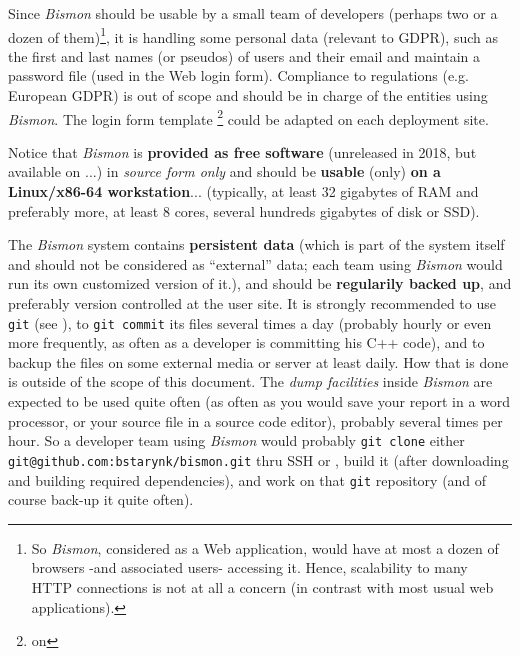 \begin{itemize}
      Since \textit{Bismon} should be usable by a small team of
      developers (perhaps two or a dozen of them)\footnote{So
        \textit{Bismon}, considered as a Web application, would have
        at most a dozen of browsers -and associated users- accessing
        it. Hence, scalability to many HTTP connections is not at all
        a concern (in contrast with most usual web applications).}, it
      is handling some personal data (relevant to GDPR), such as the
      first and last names (or pseudos) of users and their email and
      maintain a password file (used in the Web login
      form). Compliance to regulations (e.g. European GDPR) is out of
      scope and should be in charge of the entities using
      \textit{Bismon}. The login form template \footnote{on
      }
      could be adapted on each deployment site.
\end{itemize}

Notice that \textit{Bismon} is \textbf{provided as free software}
(unreleased in 2018, but available on
 ...) in \emph{source form only} and
should be \textbf{usable} (only) \textbf{on a Linux/x86-64
  workstation}... (typically, at least 32 gigabytes of RAM and
preferably more, at least 8 cores, several hundreds gigabytes of disk
or SSD).

The \textit{Bismon} system contains \textbf{persistent data} (which is
part of the system itself and should not be considered as ``external''
data; each team using \textit{Bismon} would run its own customized
version of it.), and should be \textbf{regularily backed up}, and
preferably version controlled at the user site. It is strongly
recommended to use \texttt{git} (see ), to
\texttt{git commit} its files several times a day (probably hourly or
even more frequently, as often as a developer is committing his C++
code), and to backup the files on some external media or server at
least daily. How that is done is outside of the scope of this
document. The \emph{dump facilities} inside \textit{Bismon} are
expected to be used quite often (as often as you would save your
report in a word processor, or your source file in a source code
editor), probably several times per hour. So a developer team using
\textit{Bismon} would probably \texttt{git clone} either
\texttt{git@github.com:bstarynk/bismon.git} thru SSH or
, build it (after
downloading and building required dependencies), and work on that
\texttt{git} repository (and of course back-up it quite often).


